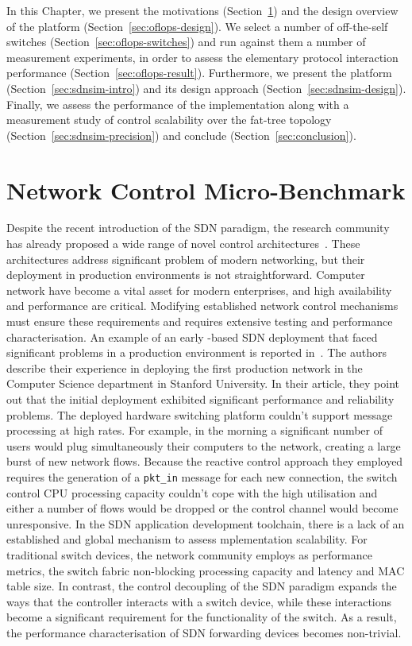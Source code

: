 In this Chapter, we present the motivations (Section~\ref{sec:oflops-intro}) and
the design overview of the \oflops platform (Section~\ref{sec:oflops-design}).
We select a number of off-the-self \of switches
(Section~\ref{sec:oflops-switches}) and run against them a number of measurement
experiments, in order to assess the elementary protocol interaction performance
(Section~\ref{sec:oflops-result}). Furthermore, we present the \sdnsim platform
(Section~\ref{sec:sdnsim-intro}) and its design approach
(Section~\ref{sec:sdnsim-design}). Finally, we assess the performance of the
\sdnsim implementation along with a measurement study of control
scalability over the fat-tree topology (Section~\ref{sec:sdnsim-precision})
and conclude (Section~\ref{sec:conclusion}). 


\section{Network Control Micro-Benchmark} \label{sec:oflops-intro}

Despite the recent introduction of the SDN paradigm, the research community has
already proposed a wide range of novel control architectures~\cite{plug_n_serv,
  difane,flowvisor-osdi}. These architectures address significant problem of
modern networking, but their deployment in production environments is not
straightforward.  Computer network have become a vital asset for modern
enterprises, and high availability and performance are critical. Modifying
established network control mechanisms must ensure these requirements and
requires extensive testing and performance characterisation.  An example of an
early \of-based SDN deployment that faced significant problems in a production
environment is reported in~\cite{Weissmann:va}. The authors describe their
experience in deploying the first \of production network in the Computer Science
department in Stanford University. In their article, they point out that the
initial deployment exhibited significant performance and reliability problems.
The deployed hardware switching platform couldn't support \of message processing
at high rates. For example, in the morning a significant number of users would
plug simultaneously their computers to the network, creating a large burst of
new network flows. Because the reactive control approach they employed requires
the generation of a {\tt pkt\_in} message for each new connection, the switch
control CPU processing capacity couldn't cope with the high utilisation and
either a number of flows would be dropped or the control channel would become
unresponsive. In the SDN application development toolchain, there is a lack of
an established and global mechanism to assess \of mplementation scalability.  For
traditional switch devices, the network community employs as performance
metrics, the switch fabric non-blocking processing capacity and latency and MAC
table size. In contrast, the control decoupling of the SDN paradigm expands the
ways that the controller interacts with a switch device, while these
interactions become a significant requirement for the functionality of the
switch. As a result, the performance characterisation of SDN forwarding devices
becomes non-trivial. 

